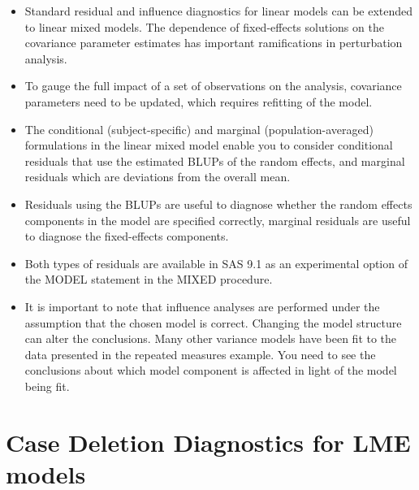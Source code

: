 \documentclass[12pt, a4paper]{article}
\begin{document}
\begin{itemize}
	\item Standard residual and inﬂuence diagnostics for linear models can be extended to linear mixed models. The dependence of ﬁxed-effects solutions on the covariance parameter estimates has important ramiﬁcations in perturbation analysis. 
	\item To gauge the full impact of a set of observations on the analysis, covariance parameters need to be updated, which requires reﬁtting of the model. 
	
	\item The conditional (subject-speciﬁc) and marginal (population-averaged) formulations in the linear mixed model enable you to consider conditional residuals that use the estimated BLUPs of the random effects, and marginal residuals which are deviations from the overall mean. 
	\item Residuals using the BLUPs are useful to diagnose whether the random effects components in the model are speciﬁed correctly, marginal residuals are useful to diagnose the ﬁxed-effects components. 
	\item Both types of residuals are available in SAS 9.1 as an experimental option of the MODEL statement in the MIXED procedure.
	
	\item It is important to note that influence analyses are performed under the assumption that the chosen model is correct. Changing the model structure can alter the conclusions. Many other variance models have been ﬁt to the data presented in the repeated measures example. You need to see the conclusions about which model component is affected in light of the model being fit.
\end{itemize}



	
	\section{Case Deletion Diagnostics for LME models}
	
\end{document}
